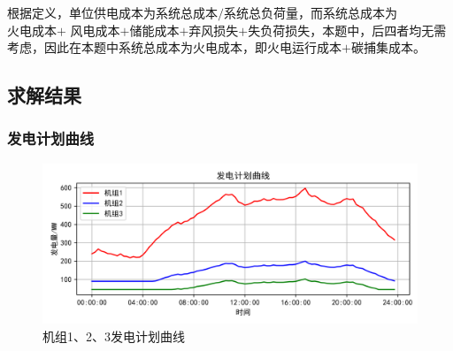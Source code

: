 \documentclass{cumcmthesis}
\begin{document}
  根据定义，单位供电成本为$ \texttt{系统总成本}/\texttt{系统总负荷量} $，而系统总成本为$ \texttt{火电成本+}$  $\texttt{风电成本+储能成本+弃风损失+失负荷损失} $，本题中，后四者均无需考虑，因此在本题中系统总成本为$ \texttt{火电成本} $，即$ \texttt{火电运行成本+碳捕集成本} $。
  
  
  \subsection{求解结果}
  
  \subsubsection{发电计划曲线}
  \begin{figure}[H]
  	\centering
  	\includegraphics[width=1\linewidth]{figures/三台火电机组最优发电曲线}
  	\caption{机组1、2、3发电计划曲线}
  	\label{fig:screenshot001}
  \end{figure}
  
\end{document}
